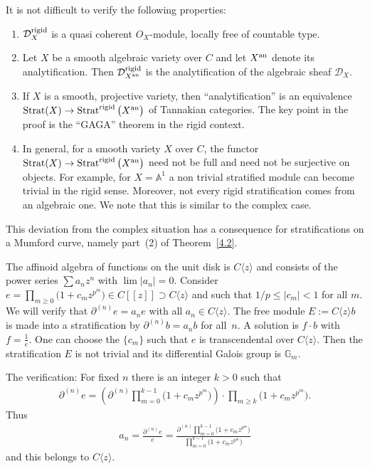 \documentclass[pdftex]{sigma}
\numberwithin{equation}{section}
\begin{document}
It is not difficult to verify the following properties:
\begin{enumerate}\itemsep=0pt
\item[(a)] $\mathcal{D}^{\rm rigid}_X$ is a quasi coherent $O_X$-module, locally free of countable type.
\item[(b)] Let $X$ be a smooth algebraic variety over $C$ and let $X^{\rm an}$ denote its analytification. Then $\mathcal{D}_{X^{\rm an}}^{\rm rigid}$ is the analytification of the algebraic sheaf $\mathcal{D}_X$.
\item[(c)] If $X$ is a smooth, projective variety, then ``analytification'' is an equivalence $\operatorname{Strat}(X)\rightarrow \operatorname{Strat}^{\rm rigid}\big(X^{\rm an}\big)$ of Tannakian categories. The key point in the proof is the ``GAGA'' theorem in the rigid context.
\item[(d)] In general, for a smooth variety $X$ over $C$, the functor $\operatorname{Strat}(X)\rightarrow \operatorname{Strat}^{\rm rigid}\big(X^{\rm an}\big)$ need not be full and need not be surjective on objects. For example, for $X=\mathbb{A}^1$ a non trivial stratified module can become trivial in the rigid sense. Moreover, not every rigid stratification comes from an algebraic one. We note that this is similar to the complex case.
\end{enumerate}

\begin{Example}\label{4.1} This deviation from the complex situation has a consequence for stratifications on a Mumford curve, namely part~(2) of Theorem~\ref{4.2}.

The affinoid algebra of functions on the unit disk is $C\langle z\rangle$ and consists of the power series $\sum a_nz^n$ with $\lim |a_n|=0$. Consider $e=\prod\limits_{m\geq 0}\big(1+ c_mz^{p^m}\big)\in C[[z]]\supset C\langle z\rangle$ and such that $1/p \leq |c_m|<1$ for all $m$. We will verify that $\partial^{(n)}e=a_ne$ with all $a_n\in C\langle z\rangle $. The free module $E:=C\langle z\rangle b$ is made into a stratification by $\partial^{(n)}b=a_nb$ for all~$n$. A solution is $f\cdot b$ with $f=\frac{1}{e}$. One can choose the $\{c_m\}$ such that $e$ is transcendental over $C\langle z\rangle$. Then the stratification $E$ is not trivial and its differential Galois group is $\mathbb{G}_m$.

 The verification: For fixed $n$ there is an integer $k>0$ such that
\begin{gather*} \partial^{(n)}e= \left(\partial^{(n) }\prod_{m=0}^{k-1} \big(1+c_mz^{p^m}\big)\right)\cdot \prod_{m\geq k}\big(1+c_mz^{p^m}\big).\end{gather*}
 Thus \begin{gather*} a_n=\frac{\partial^{(n)}e}{e}=\frac{\partial^{(n)}\prod\limits_{m=0}^{k-1} \big(1+c_mz^{p^m}\big)}{\prod\limits_{m=0}^{k-1} \big(1+c_mz^{p^m}\big)}\end{gather*} and this belongs to $C\langle z\rangle$. \end{Example}
\end{document}
